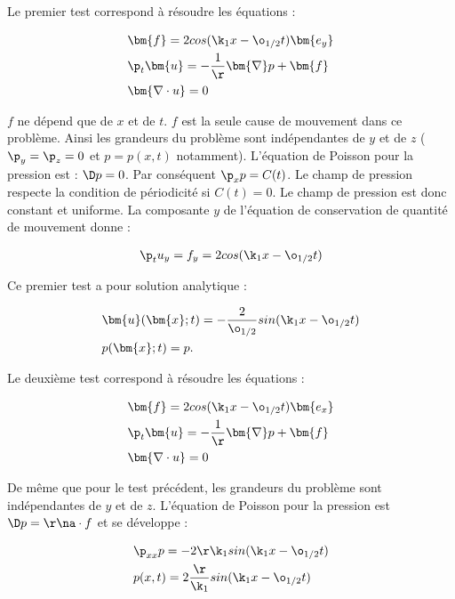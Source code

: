 Le premier test correspond à résoudre les équations : 

\begin{align*}
&\bm{f} = 2 cos(\k_1 x - \o_{1/2} t) \bm{e_y} \\
&\p_t \bm{u} = - \frac{1}{\r} \bm{\nabla} p + \bm{f} \\                
&\bm{ \nabla \cdot u } = 0 \\
\end{align*}

$f$ ne dépend que de $x$ et de $t$. $f$ est la seule cause de mouvement dans ce problème. Ainsi les grandeurs du problème sont indépendantes de $y$ et de $z$ ($\p_y = \p_z = 0$ et $p=p(x,t)$ notamment). L'équation de Poisson pour la pression est : $\D p = 0$. Par conséquent $\p_x p  = C(t)$. Le champ de pression respecte la condition de périodicité si $C(t) = 0$. Le champ de pression est donc constant et uniforme.
La composante $y$ de l'équation de conservation de quantité de mouvement donne : 

\begin{align*}
&\p_t u_y = f_y = 2 cos(\k_1 x - \o_{1/2} t)\\ 
\end{align*}

Ce premier test a pour solution analytique :
\begin{mdframed}
\begin{align*} 
&\bm{u}(\bm{x};t) = - \frac{2}{\o_{1/2}} sin(\k_1 x - \o_{1/2} t)  \\
&p(\bm{x};t)=p.   
\end{align*}
\end{mdframed}

Le deuxième test correspond à résoudre les équations : 

\begin{align*}
&\bm{f} = 2 cos(\k_1 x - \o_{1/2} t) \bm{e_x} \\
&\p_t \bm{u} = - \frac{1}{\r} \bm{\nabla} p + \bm{f} \\                
&\bm{ \nabla \cdot u } = 0 \\
\end{align*}

De même que pour le test précédent, les grandeurs du problème sont indépendantes de $y$ et de $z$. L’équation de Poisson pour la pression est $\D p = \r \na \cdot f$ et se développe :  

\begin{align*}
&\p_{xx} p= - 2 \r \k_1 sin(\k_1 x - \o_{1/2} t) \\
&p(x,t) = 2 \frac{\r}{\k_1} sin(\k_1 x - \o_{1/2} t)
\end{align*}

